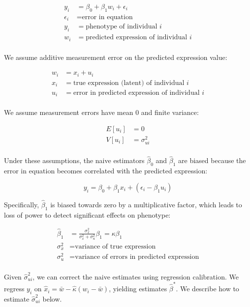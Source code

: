 \documentclass{article}
\begin{document}
\begin{align*}
  y_i &= \beta_0 + \beta_1 w_i + \epsilon_i\\
  \epsilon_i &= \text{error in equation}\\
  y_i &= \text{phenotype of individual $i$}\\
  w_i &= \text{predicted expression of individual $i$}\\
\end{align*}

We assume additive measurement error on the predicted expression value:

\begin{align*}
  w_i &= x_i + u_i\\
  x_i &= \text{true expression (latent) of individual $i$}\\
  u_i &= \text{error in predicted expression of individual $i$}\\
\end{align*}

We assume measurement errors have mean 0 and finite variance:

\begin{align*}
  E[u_i] &= 0\\
  V[u_i] &= \sigma_{ui}^2\\
\end{align*}

Under these assumptions, the naive estimators \(\hat\beta_0\) and \(\hat\beta_1\)
are biased because the error in equation becomes correlated with the predicted
expression:

\begin{equation}
  y_i = \beta_0 + \beta_1 x_i + (\epsilon_i - \beta_1 u_i)
\end{equation}

Specifically, \(\hat\beta_1\) is biased towards zero by a multiplicative factor,
which leads to loss of power to detect significant effects on phenotype:

\begin{align*}
  \hat\beta_1 &= \frac{\sigma_x^2}{\sigma_x^2 + \sigma_u^2} \beta_1 = \kappa \beta_1\\
  \sigma_x^2 &= \text{variance of true expression}\\
  \sigma_u^2 &= \text{variance of errors in predicted expression}\\
\end{align*}

Given \(\hat\sigma_{ui}^2\), we can correct the naive estimates using regression
calibration. We regress \(y_i\) on \(\hat x_i = \bar w - \hat\kappa (w_i - \bar
w)\), yielding estimates \(\hat\beta^*\). We describe how to estimate
\(\hat\sigma_{ui}^2\) below.
\end{document}
